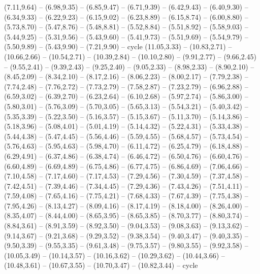 \expandafter\def\csname geo:gebiet:1945-Sweden\endcsname{
  (7.11,9.64) -- (6.98,9.35) -- (6.85,9.47) -- (6.71,9.39) -- (6.42,9.43) -- (6.40,9.30) -- (6.34,9.33) -- (6.22,9.23) -- (6.15,9.02) -- (6.23,8.89) -- (6.15,8.74) -- (6.00,8.80) -- (5.73,8.70) -- (5.47,8.76) -- (5.48,8.81) -- (5.52,8.84) -- (5.51,8.92) -- (5.58,9.03) -- (5.44,9.25) -- (5.31,9.56) -- (5.43,9.60) -- (5.41,9.73) -- (5.51,9.69) -- (5.54,9.79) -- (5.50,9.89) -- (5.43,9.90) -- (7.21,9.90) -- cycle}
\expandafter\def\csname geo:gebiet:1945-Czechoslovakia\endcsname{
  (11.05,3.33) -- (10.83,2.71) -- (10.66,2.66) -- (10.54,2.71) -- (10.39,2.84) -- (10.10,2.80) -- (9.91,2.77) -- (9.66,2.45) -- (9.55,2.41) -- (9.39,2.43) -- (9.25,2.40) -- (9.05,2.33) -- (8.98,2.33) -- (8.90,2.10) -- (8.45,2.09) -- (8.34,2.10) -- (8.17,2.16) -- (8.06,2.23) -- (8.00,2.17) -- (7.79,2.38) -- (7.74,2.48) -- (7.76,2.72) -- (7.73,2.79) -- (7.58,2.87) -- (7.23,2.79) -- (6.96,2.88) -- (6.59,3.02) -- (6.39,2.70) -- (6.23,2.64) -- (6.10,2.68) -- (5.97,2.74) -- (5.86,3.00) -- (5.80,3.01) -- (5.76,3.09) -- (5.70,3.05) -- (5.65,3.13) -- (5.54,3.21) -- (5.40,3.42) -- (5.35,3.39) -- (5.22,3.50) -- (5.16,3.57) -- (5.15,3.67) -- (5.11,3.70) -- (5.14,3.86) -- (5.18,3.96) -- (5.08,4.01) -- (5.01,4.19) -- (5.14,4.32) -- (5.22,4.31) -- (5.33,4.38) -- (5.44,4.38) -- (5.47,4.45) -- (5.56,4.46) -- (5.59,4.55) -- (5.68,4.57) -- (5.73,4.54) -- (5.76,4.63) -- (5.95,4.63) -- (5.98,4.70) -- (6.11,4.72) -- (6.25,4.79) -- (6.18,4.88) -- (6.29,4.91) -- (6.37,4.86) -- (6.38,4.74) -- (6.46,4.72) -- (6.50,4.76) -- (6.60,4.76) -- (6.60,4.89) -- (6.69,4.89) -- (6.75,4.86) -- (6.77,4.75) -- (6.86,4.69) -- (7.06,4.66) -- (7.10,4.58) -- (7.17,4.60) -- (7.17,4.53) -- (7.29,4.56) -- (7.30,4.59) -- (7.37,4.58) -- (7.42,4.51) -- (7.39,4.46) -- (7.34,4.45) -- (7.29,4.36) -- (7.43,4.26) -- (7.51,4.11) -- (7.59,4.08) -- (7.65,4.16) -- (7.75,4.21) -- (7.68,4.33) -- (7.67,4.39) -- (7.75,4.38) -- (7.95,4.26) -- (8.13,4.27) -- (8.09,4.16) -- (8.17,4.19) -- (8.18,4.00) -- (8.26,4.00) -- (8.35,4.07) -- (8.44,4.00) -- (8.65,3.95) -- (8.65,3.85) -- (8.70,3.77) -- (8.80,3.74) -- (8.84,3.61) -- (8.91,3.59) -- (8.92,3.50) -- (9.04,3.53) -- (9.08,3.63) -- (9.13,3.62) -- (9.14,3.67) -- (9.21,3.68) -- (9.29,3.52) -- (9.38,3.54) -- (9.40,3.47) -- (9.40,3.35) -- (9.50,3.39) -- (9.55,3.35) -- (9.61,3.48) -- (9.75,3.57) -- (9.80,3.55) -- (9.92,3.58) -- (10.05,3.49) -- (10.14,3.57) -- (10.16,3.62) -- (10.29,3.62) -- (10.44,3.66) -- (10.48,3.61) -- (10.67,3.55) -- (10.70,3.47) -- (10.82,3.44) -- cycle}
